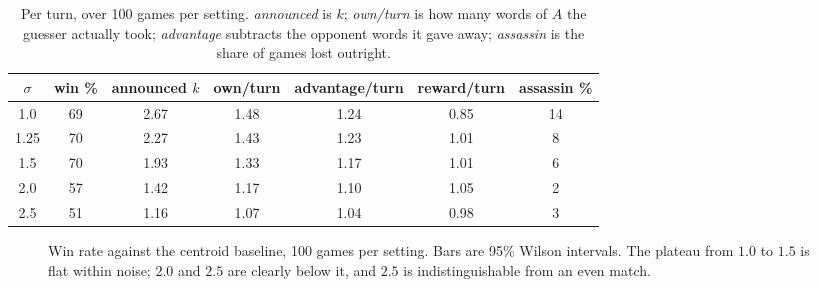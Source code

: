 \documentclass[12pt]{article}
\begin{document}
\begin{table}[H]
\centering
\small
\begin{tabular}{
  S[table-format=1.2] S[table-format=2.0]
  S[table-format=1.2] S[table-format=1.2] S[table-format=1.2] S[table-format=1.2]
  S[table-format=2.0]}
\toprule
{$\sigma$} & {win \%} & {announced $k$} & {own/turn} & {advantage/turn}
  & {reward/turn} & {assassin \%} \\
  & 69 & 2.67 & 1.48 & 1.24 & 0.85 & 14 \\
 1.25 & 70 & 2.27 & 1.43 & 1.23 & 1.01 &  8 \\
 1.5  & 70 & 1.93 & 1.33 & 1.17 & 1.01 &  6 \\
 2.0  & 57 & 1.42 & 1.17 & 1.10 & 1.05 &  2 \\
 2.5  & 51 & 1.16 & 1.07 & 1.04 & 0.98 &  3 \\
\bottomrule
\end{tabular}
\caption*{\footnotesize Per turn, over 100 games per setting.
\emph{announced} is $k$; \emph{own/turn} is how many words of $A$ the guesser
actually took; \emph{advantage} subtracts the opponent words it gave away;
\emph{assassin} is the share of games lost outright.}
\end{table}

\begin{figure}[H]
\centering
{}
\caption*{\footnotesize Win rate against the centroid baseline, 100 games per
setting. Bars are 95\% Wilson intervals. The plateau from $1.0$ to $1.5$ is flat
within noise; $2.0$ and $2.5$ are clearly below it, and $2.5$ is
indistinguishable from an even match.}
\end{figure}
\end{document}
